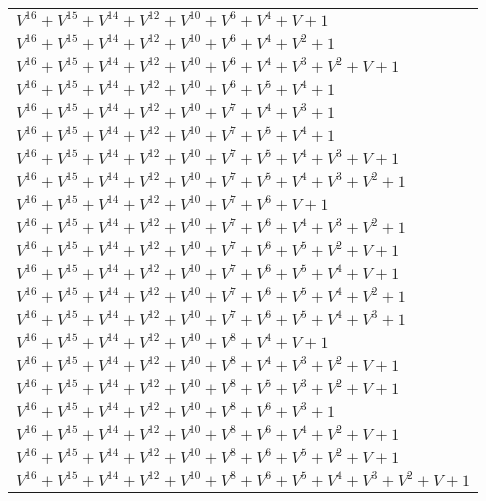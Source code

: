 \documentclass[12pt]{article}
\begin{document}
\begin{adjustwidth}{-4cm}{}
\begin{center}
\begin{longtable}{|l|}
$V^{16}  +V^{15}  +V^{14}  +V^{12}  +V^{10}  +V^{6}  +V^{4}  + V + 1$ \\
$V^{16}  +V^{15}  +V^{14}  +V^{12}  +V^{10}  +V^{6}  +V^{4}  +V^{2}  + 1$ \\
$V^{16}  +V^{15}  +V^{14}  +V^{12}  +V^{10}  +V^{6}  +V^{4}  +V^{3}  +V^{2}  + V + 1$ \\
$V^{16}  +V^{15}  +V^{14}  +V^{12}  +V^{10}  +V^{6}  +V^{5}  +V^{4}  + 1$ \\
$V^{16}  +V^{15}  +V^{14}  +V^{12}  +V^{10}  +V^{7}  +V^{4}  +V^{3}  + 1$ \\
$V^{16}  +V^{15}  +V^{14}  +V^{12}  +V^{10}  +V^{7}  +V^{5}  +V^{4}  + 1$ \\
$V^{16}  +V^{15}  +V^{14}  +V^{12}  +V^{10}  +V^{7}  +V^{5}  +V^{4}  +V^{3}  + V + 1$ \\
$V^{16}  +V^{15}  +V^{14}  +V^{12}  +V^{10}  +V^{7}  +V^{5}  +V^{4}  +V^{3}  +V^{2}  + 1$ \\
$V^{16}  +V^{15}  +V^{14}  +V^{12}  +V^{10}  +V^{7}  +V^{6}  + V + 1$ \\
$V^{16}  +V^{15}  +V^{14}  +V^{12}  +V^{10}  +V^{7}  +V^{6}  +V^{4}  +V^{3}  +V^{2}  + 1$ \\
$V^{16}  +V^{15}  +V^{14}  +V^{12}  +V^{10}  +V^{7}  +V^{6}  +V^{5}  +V^{2}  + V + 1$ \\
$V^{16}  +V^{15}  +V^{14}  +V^{12}  +V^{10}  +V^{7}  +V^{6}  +V^{5}  +V^{4}  + V + 1$ \\
$V^{16}  +V^{15}  +V^{14}  +V^{12}  +V^{10}  +V^{7}  +V^{6}  +V^{5}  +V^{4}  +V^{2}  + 1$ \\
$V^{16}  +V^{15}  +V^{14}  +V^{12}  +V^{10}  +V^{7}  +V^{6}  +V^{5}  +V^{4}  +V^{3}  + 1$ \\
$V^{16}  +V^{15}  +V^{14}  +V^{12}  +V^{10}  +V^{8}  +V^{4}  + V + 1$ \\
$V^{16}  +V^{15}  +V^{14}  +V^{12}  +V^{10}  +V^{8}  +V^{4}  +V^{3}  +V^{2}  + V + 1$ \\
$V^{16}  +V^{15}  +V^{14}  +V^{12}  +V^{10}  +V^{8}  +V^{5}  +V^{3}  +V^{2}  + V + 1$ \\
$V^{16}  +V^{15}  +V^{14}  +V^{12}  +V^{10}  +V^{8}  +V^{6}  +V^{3}  + 1$ \\
$V^{16}  +V^{15}  +V^{14}  +V^{12}  +V^{10}  +V^{8}  +V^{6}  +V^{4}  +V^{2}  + V + 1$ \\
$V^{16}  +V^{15}  +V^{14}  +V^{12}  +V^{10}  +V^{8}  +V^{6}  +V^{5}  +V^{2}  + V + 1$ \\
$V^{16}  +V^{15}  +V^{14}  +V^{12}  +V^{10}  +V^{8}  +V^{6}  +V^{5}  +V^{4}  +V^{3}  +V^{2}  + V + 1$ \\

\end{longtable}
\end{center}
\end{adjustwidth}
\end{document}
